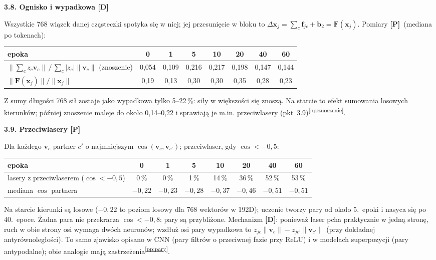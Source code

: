 \documentclass[a4paper,11pt]{article}
\newcommand{\stD}{\textcolor{dok}{\textsf{\textbf{[D]}}}}
\newcommand{\stP}{\textcolor{pom}{\textsf{\textbf{[P]}}}}
\newcommand{\pp}[1]{\textsuperscript{\ref{pp:#1}}}
\newcommand{\elem}[1]{\par\medskip\noindent\textbf{#1}\par\nopagebreak}
\begin{document}
\elem{3.8. Ognisko i wypadkowa \stD}
Wszystkie 768 wiązek danej cząsteczki spotyka się w niej; jej przesunięcie w bloku to $\Delta\bm x_j=\sum_c\bm f_{jc}+\bm b_2=\bm F(\bm x_j)$.
Pomiary \stP\ (mediana po tokenach):
\begin{center}\small
\begin{tabular}{lccccccc}\toprule
epoka & 0 & 1 & 5 & 10 & 20 & 40 & 60\\\midrule
$\lVert\sum_c z_c\bm v_c\rVert\,/\,\sum_c|z_c|\lVert\bm v_c\rVert$ (znoszenie) & 0,054 & 0,109 & 0,216 & 0,217 & 0,198 & 0,147 & 0,144\\
$\lVert\bm F(\bm x_j)\rVert/\lVert\bm x_j\rVert$ & 0,19 & 0,13 & 0,30 & 0,30 & 0,35 & 0,28 & 0,23\\\bottomrule
\end{tabular}
\end{center}
Z sumy długości 768 sił zostaje jako wypadkowa tylko 5--22\,\%: siły w większości się znoszą. Na starcie to efekt sumowania
losowych kierunków; później znoszenie maleje do około 0,14--0,22 i sprawiają je m.in. przeciwlasery (pkt~3.9)\pp{znoszenie}.

\elem{3.9. Przeciwlasery \stP}
Dla każdego $\bm v_c$ partner $c'$ o najmniejszym $\cos(\bm v_c,\bm v_{c'})$; przeciwlaser, gdy $\cos<-0{,}5$:
\begin{center}\small
\begin{tabular}{lccccccc}\toprule
epoka & 0 & 1 & 5 & 10 & 20 & 40 & 60\\\midrule
lasery z przeciwlaserem ($\cos<-0{,}5$) & 0\,\% & 0\,\% & 1\,\% & 14\,\% & 36\,\% & 52\,\% & 53\,\%\\
mediana $\cos$ partnera & $-0{,}22$ & $-0{,}23$ & $-0{,}28$ & $-0{,}37$ & $-0{,}46$ & $-0{,}51$ & $-0{,}51$\\\bottomrule
\end{tabular}
\end{center}
Na starcie kierunki są losowe ($-0{,}22$ to poziom losowy dla 768 wektorów w 192D); uczenie tworzy pary od około 5.~epoki i nasyca
się po 40.~epoce. Żadna para nie przekracza $\cos<-0{,}8$: pary są przybliżone. Mechanizm \stD: ponieważ laser pcha praktycznie
w jedną stronę, ruch w obie strony osi wymaga dwóch neuronów; wzdłuż osi pary wypadkowa to
$z_{jc}\lVert\bm v_c\rVert-z_{jc'}\lVert\bm v_{c'}\rVert$ (przy dokładnej antyrównoległości). To samo zjawisko opisano w CNN
(pary filtrów o przeciwnej fazie przy ReLU) i w modelach superpozycji (pary antypodalne); obie analogie mają zastrzeżenia\pp{pary}.
\end{document}
